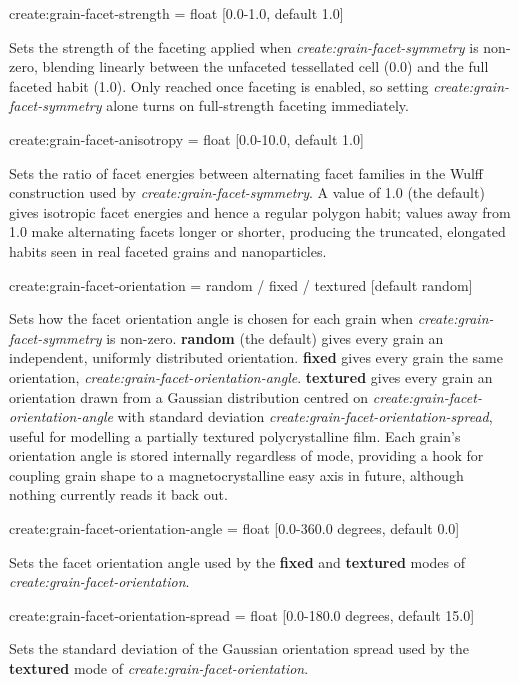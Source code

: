 {\zicf create:grain-facet-strength = float [0.0-1.0, default 1.0]} Sets the strength of the faceting applied when \textit{create:grain-facet-symmetry} is non-zero, blending linearly between the unfaceted tessellated cell (0.0) and the full faceted habit (1.0). Only reached once faceting is enabled, so setting \textit{create:grain-facet-symmetry} alone turns on full-strength faceting immediately.

{\zicf create:grain-facet-anisotropy = float [0.0-10.0, default 1.0]} Sets the ratio of facet energies between alternating facet families in the Wulff construction used by \textit{create:grain-facet-symmetry}. A value of 1.0 (the default) gives isotropic facet energies and hence a regular polygon habit; values away from 1.0 make alternating facets longer or shorter, producing the truncated, elongated habits seen in real faceted grains and nanoparticles.

{\zicf create:grain-facet-orientation = random / fixed / textured [default random]} Sets how the facet orientation angle is chosen for each grain when \textit{create:grain-facet-symmetry} is non-zero. \textbf{random} (the default) gives every grain an independent, uniformly distributed orientation. \textbf{fixed} gives every grain the same orientation, \textit{create:grain-facet-orientation-angle}. \textbf{textured} gives every grain an orientation drawn from a Gaussian distribution centred on \textit{create:grain-facet-orientation-angle} with standard deviation \textit{create:grain-facet-orientation-spread}, useful for modelling a partially textured polycrystalline film. Each grain's orientation angle is stored internally regardless of mode, providing a hook for coupling grain shape to a magnetocrystalline easy axis in future, although nothing currently reads it back out.

{\zicf create:grain-facet-orientation-angle = float [0.0-360.0 degrees, default 0.0]} Sets the facet orientation angle used by the \textbf{fixed} and \textbf{textured} modes of \textit{create:grain-facet-orientation}.

{\zicf create:grain-facet-orientation-spread = float [0.0-180.0 degrees, default 15.0]} Sets the standard deviation of the Gaussian orientation spread used by the \textbf{textured} mode of \textit{create:grain-facet-orientation}.

